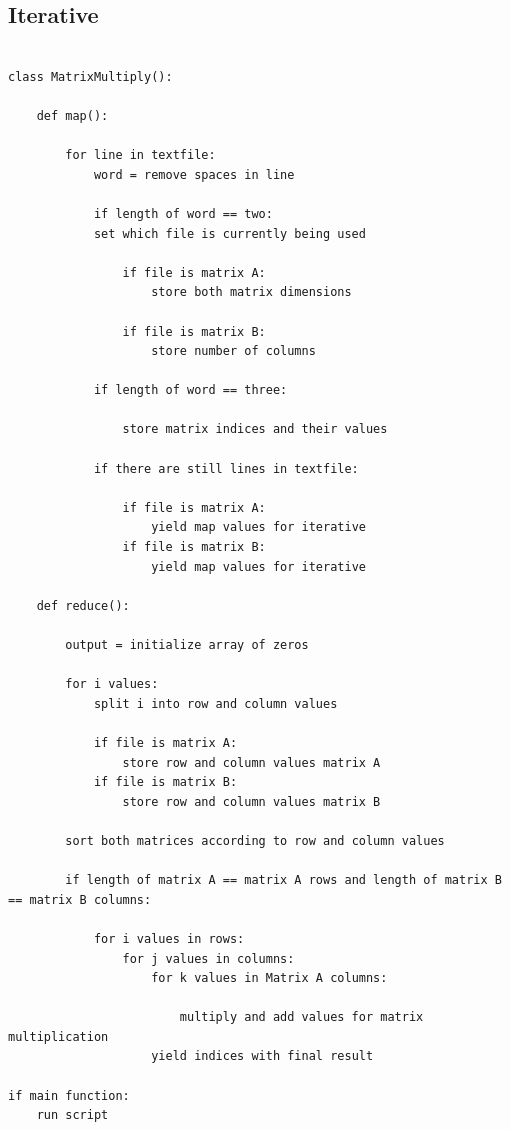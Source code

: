 \documentclass[conference]{IEEEtran}
\begin{document}
\subsection{Iterative}
\begin{verbatim}

class MatrixMultiply():

    def map():
    
        for line in textfile:
            word = remove spaces in line
		
            if length of word == two:
            set which file is currently being used
			
                if file is matrix A:
                    store both matrix dimensions
				
                if file is matrix B:
                    store number of columns
				
            if length of word == three:
		
			    store matrix indices and their values
			
            if there are still lines in textfile:
            
                if file is matrix A:
                    yield map values for iterative 
                if file is matrix B:
                    yield map values for iterative

    def reduce():

	    output = initialize array of zeros
	
        for i values:
            split i into row and column values
		
            if file is matrix A:
                store row and column values matrix A
            if file is matrix B:
                store row and column values matrix B
			
        sort both matrices according to row and column values
        
        if length of matrix A == matrix A rows and length of matrix B == matrix B columns:	
    	
            for i values in rows:
                for j values in columns:
                    for k values in Matrix A columns:
                    
                        multiply and add values for matrix multiplication
                    yield indices with final result

if main function:
    run script
    
\end{verbatim}
\end{document}
